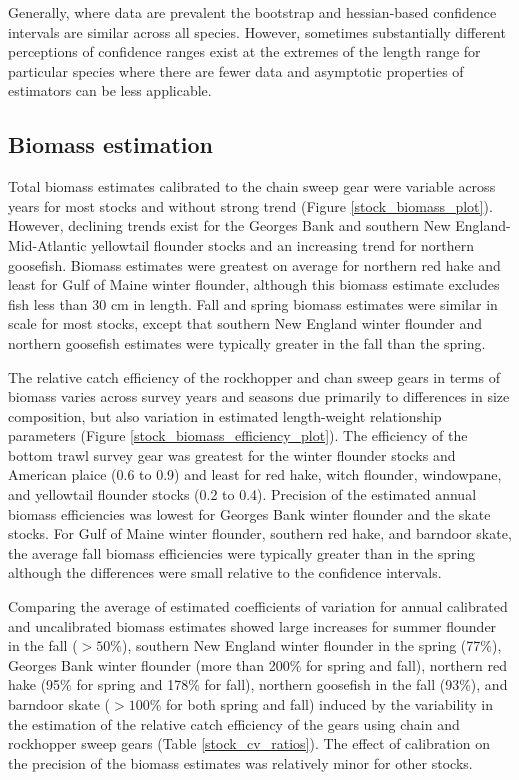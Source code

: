 \documentclass[
  12pt,
]{article}
\begin{document}
Generally, where data are prevalent the bootstrap and hessian-based
confidence intervals are similar across all species. However, sometimes
substantially different perceptions of confidence ranges exist at the
extremes of the length range for particular species where there are
fewer data and asymptotic properties of estimators can be less
applicable.

\hypertarget{biomass-estimation-1}{%
\subsection{Biomass estimation}\label{biomass-estimation-1}}

Total biomass estimates calibrated to the chain sweep gear were variable
across years for most stocks and without strong trend (Figure
\ref{stock_biomass_plot}). However, declining trends exist for the
Georges Bank and southern New England-Mid-Atlantic yellowtail flounder
stocks and an increasing trend for northern goosefish. Biomass estimates
were greatest on average for northern red hake and least for Gulf of
Maine winter flounder, although this biomass estimate excludes fish less
than 30 cm in length. Fall and spring biomass estimates were similar in
scale for most stocks, except that southern New England winter flounder
and northern goosefish estimates were typically greater in the fall than
the spring.

The relative catch efficiency of the rockhopper and chan sweep gears in
terms of biomass varies across survey years and seasons due primarily to
differences in size composition, but also variation in estimated
length-weight relationship parameters (Figure
\ref{stock_biomass_efficiency_plot}). The efficiency of the bottom trawl
survey gear was greatest for the winter flounder stocks and American
plaice (0.6 to 0.9) and least for red hake, witch flounder, windowpane,
and yellowtail flounder stocks (0.2 to 0.4). Precision of the estimated
annual biomass efficiencies was lowest for Georges Bank winter flounder
and the skate stocks. For Gulf of Maine winter flounder, southern red
hake, and barndoor skate, the average fall biomass efficiencies were
typically greater than in the spring although the differences were small
relative to the confidence intervals.

Comparing the average of estimated coefficients of variation for annual
calibrated and uncalibrated biomass estimates showed large increases for
summer flounder in the fall (\(> 50\%\)), southern New England winter
flounder in the spring (77\%), Georges Bank winter flounder (more than
200\% for spring and fall), northern red hake (95\% for spring and 178\%
for fall), northern goosefish in the fall (93\%), and barndoor skate
(\(>100\%\) for both spring and fall) induced by the variability in the
estimation of the relative catch efficiency of the gears using chain and
rockhopper sweep gears (Table \ref{stock_cv_ratios}). The effect of
calibration on the precision of the biomass estimates was relatively
minor for other stocks.
\end{document}
